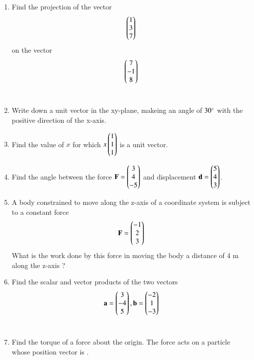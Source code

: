 \begin{enumerate}[label=\arabic*.,ref=\thesubsection.\theenumi]
\item Find the projection of the vector 
\begin{align}
\begin{pmatrix}1\\3\\7\end{pmatrix}
\end{align}
on the vector
\begin{align}
\begin{pmatrix}7\\-1\\8\end{pmatrix}
\end{align}
\\
\solution 

\item Write down a unit vector in the xy-plane, makeing an angle of $30\degree$ with the positive direction of the x-axis.
\\
\solution 


\item Find the value of $x$ for which $x\begin{pmatrix}1\\1\\1\end{pmatrix}$ is a unit vector.
\\
\solution

\item Find the angle between the force $\mathbf{F} = \begin{pmatrix}3\\4\\-5\end{pmatrix}$ and displacement $\mathbf{d} = \begin{pmatrix}5\\4\\3\end{pmatrix}$.
%
\\
\solution 


\item A body constrained to move along the z-axis of a coordinate system is subject to a constant force
\begin{align}
\mathbf{F} = \begin{pmatrix}-1\\2\\3\end{pmatrix}
\end{align}
%
What is the work done by this force in moving the body a distance of 4 m along the z-axis ?
\\
\solution 

\item Find the scalar and vector products of the two vectors
\begin{align}
\mathbf{a} = \begin{pmatrix}3\\-4\\5\end{pmatrix}, 
\mathbf{b} = \begin{pmatrix}-2\\1\\-3\end{pmatrix}
\end{align}
%
\\
\solution 

\item Find the torque of a force 
about the origin. The force
acts on a particle whose position vector is .
\\
\solution 

\end{enumerate}
%

